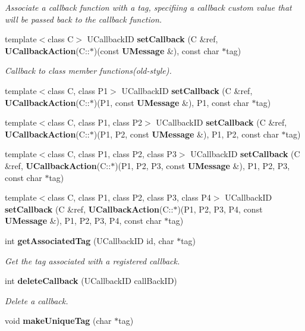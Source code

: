 \begin{CompactItemize}
\begin{CompactList}\small\item\em Associate a callback function with a tag, specifiing a callback custom value that will be passed back to the callback function. \item\end{CompactList}\item 
template$<$class C$>$ UCallback\-ID {\bf set\-Callback} (C \&ref, {\bf UCallback\-Action}(C::$\ast$)(const {\bf UMessage} \&), const char $\ast$tag)\label{classUAbstractClient_a22}

\begin{CompactList}\small\item\em Callback to class member functions(old-style). \item\end{CompactList}\item 
template$<$class C, class P1$>$ UCallback\-ID {\bf set\-Callback} (C \&ref, {\bf UCallback\-Action}(C::$\ast$)(P1, const {\bf UMessage} \&), P1, const char $\ast$tag)\label{classUAbstractClient_a23}

\item 
template$<$class C, class P1, class P2$>$ UCallback\-ID {\bf set\-Callback} (C \&ref, {\bf UCallback\-Action}(C::$\ast$)(P1, P2, const {\bf UMessage} \&), P1, P2, const char $\ast$tag)\label{classUAbstractClient_a24}

\item 
template$<$class C, class P1, class P2, class P3$>$ UCallback\-ID {\bf set\-Callback} (C \&ref, {\bf UCallback\-Action}(C::$\ast$)(P1, P2, P3, const {\bf UMessage} \&), P1, P2, P3, const char $\ast$tag)\label{classUAbstractClient_a25}

\item 
template$<$class C, class P1, class P2, class P3, class P4$>$ UCallback\-ID {\bf set\-Callback} (C \&ref, {\bf UCallback\-Action}(C::$\ast$)(P1, P2, P3, P4, const {\bf UMessage} \&), P1, P2, P3, P4, const char $\ast$tag)\label{classUAbstractClient_a26}

\item 
int {\bf get\-Associated\-Tag} (UCallback\-ID id, char $\ast$tag)
\begin{CompactList}\small\item\em Get the tag associated with a registered callback. \item\end{CompactList}\item 
int {\bf delete\-Callback} (UCallback\-ID call\-Back\-ID)
\begin{CompactList}\small\item\em Delete a callback. \item\end{CompactList}\item 
void {\bf make\-Unique\-Tag} (char $\ast$tag)\label{classUAbstractClient_a29}


\end{CompactItemize}
